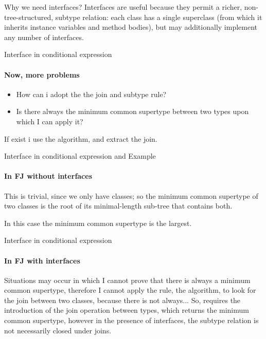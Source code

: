 \documentclass{beamer}
\begin{document}
\begin{frame}{Why we need interfaces?}
    Interfaces are useful because they permit a richer, non-tree-structured, subtype relation: each class has a single superclass (from which it inherits instance variables and method bodies), but may additionally implement any number of interfaces.\newline\newline
    

\end{frame}

\begin{frame}{Interface in conditional expression}
\framesubtitle{Now, more problems}
\begin{itemize}
    \item  How can i adopt the the join and subtype rule?
    \item  Is there always the minimum common supertype between two types upon which I can apply it?
    \end{itemize}
If exist i use the algorithm, and extract the join.
\end{frame}


\begin{frame}{Interface in conditional expression and Example}
\framesubtitle{In FJ without interfaces}
This is trivial, since we only have classes; so the minimum common supertype of two classes is the root of its minimal-length sub-tree that contains both.
    \begin{center}
\end{center}
In this case the minimum common supertype is the largest.
\end{frame}

\begin{frame}{Interface in conditional expression}
    \framesubtitle{In FJ with interfaces}
    Situations may occur in which I cannot prove that there is always a minimum common supertype, therefore I cannot apply the rule, the algorithm, to look for the join between two classes, because there is not always...\newline
 So, requires the introduction of the join operation between types, which returns the minimum common supertype, however in the presence of interfaces, the subtype relation is not necessarily closed under joins. 
\end{frame}
\end{document}
